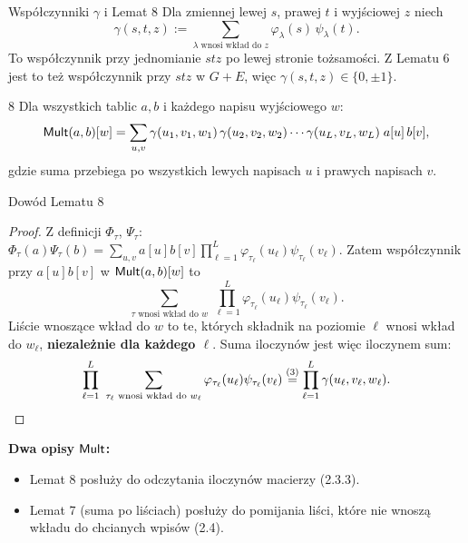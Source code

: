 \begin{frame}{Współczynniki $\gamma$ i Lemat 8}
  \small
  Dla zmiennej lewej $s$, prawej $t$ i wyjściowej $z$ niech
  \[
    \gamma(s,t,z):=\sum_{\lambda\text{ wnosi wkład do }z}\varphi_\lambda(s)\,\psi_\lambda(t).\tag{3}
  \]
  To współczynnik przy jednomianie $stz$ po lewej stronie tożsamości. Z Lematu 6 jest to też współczynnik przy $stz$ w $G+E$, więc $\gamma(s,t,z)\in\{0,\pm1\}$.
  \pause
  \begin{lemat}{8}
    Dla wszystkich tablic $a,b$ i każdego napisu wyjściowego $w$:
    \[
      \mathsf{Mult}(a,b)[w]=\sum_{u,v}\gamma(u_1,v_1,w_1)\,\gamma(u_2,v_2,w_2)\cdots\gamma(u_L,v_L,w_L)\;a[u]\,b[v],
    \]
    gdzie suma przebiega po wszystkich lewych napisach $u$ i prawych napisach $v$.
  \end{lemat}
\end{frame}

\begin{frame}{Dowód Lematu 8}
  \begin{proof}
    Z definicji $\Phi_\tau$, $\Psi_\tau$:
    \(\Phi_\tau(a)\Psi_\tau(b)=\sum_{u,v}a[u]b[v]\prod_{\ell=1}^{L}\varphi_{\tau_\ell}(u_\ell)\psi_{\tau_\ell}(v_\ell).\)
    \pause
    Zatem współczynnik przy $a[u]b[v]$ w $\mathsf{Mult}(a,b)[w]$ to
    \[
      \sum_{\tau\text{ wnosi wkład do }w}\ \prod_{\ell=1}^{L}\varphi_{\tau_\ell}(u_\ell)\psi_{\tau_\ell}(v_\ell).
    \]
    \pause
    Liście wnoszące wkład do $w$ to te, których składnik na poziomie $\ell$ wnosi wkład do $w_\ell$,
    \textbf{niezależnie dla każdego $\ell$}. Suma iloczynów jest więc iloczynem sum:
    \[
      \prod_{\ell=1}^{L}\ \sum_{\tau_\ell\text{ wnosi wkład do }w_\ell}\varphi_{\tau_\ell}(u_\ell)\psi_{\tau_\ell}(v_\ell)
      \overset{(3)}{=}\prod_{\ell=1}^{L}\gamma(u_\ell,v_\ell,w_\ell).\qedhere
    \]
  \end{proof}
  \pause
  \small\textbf{Dwa opisy $\mathsf{Mult}$:}
  \begin{itemize}
    \item Lemat 8 posłuży do odczytania iloczynów macierzy (2.3.3).
    \item Lemat 7 (suma po liściach) posłuży do pomijania liści, które nie wnoszą wkładu do chcianych wpisów (2.4).
  \end{itemize}
\end{frame}

